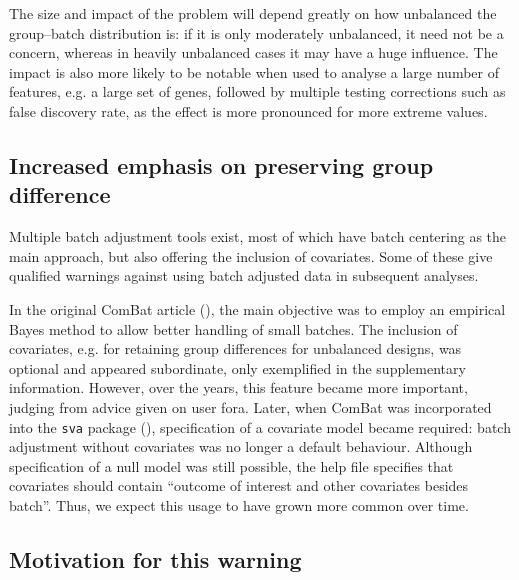 \documentclass{bio}
\begin{document}
The size and impact of the problem will depend greatly on how unbalanced the group--batch distribution is: if it is only moderately unbalanced, it need not be a concern, whereas in heavily unbalanced cases it may have a huge influence. The impact is also more likely to be notable when used to analyse a large number of features, e.g. a large set of genes, followed by multiple testing corrections such as false discovery rate, as the effect is more pronounced for more extreme values.

\subsection{Increased emphasis on preserving group difference}

Multiple batch adjustment tools exist, most of which have batch centering as the main approach, but also offering the inclusion of covariates. Some of these give qualified warnings against using batch adjusted data in subsequent analyses.

In the original ComBat article (\citealp{Johnson2007}), the main objective was to employ an empirical Bayes method to allow better handling of small batches. The inclusion of covariates, e.g. for retaining group differences for unbalanced designs, was optional and appeared subordinate, only exemplified in the supplementary information. However, over the years, this feature became more important, judging from advice given on user fora.
Later, when ComBat was incorporated into the \texttt{sva} package (\citealp{Leek2012}), specification of a covariate model became required: batch adjustment without covariates was no longer a default behaviour. Although specification of a null model was still possible, the help file specifies that covariates should contain ``outcome of interest and other covariates besides batch''. Thus, we expect this usage to have grown more common over time.

\subsection{Motivation for this warning}
\end{document}
